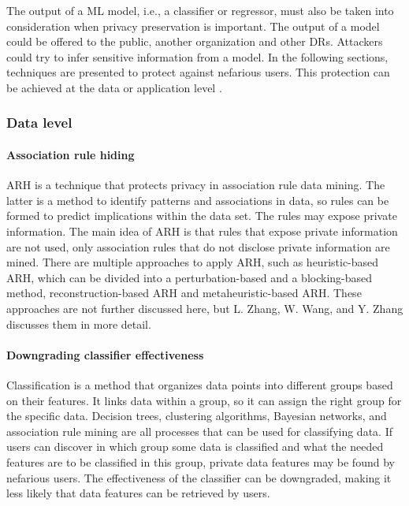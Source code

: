 The output of a \gls{ML} model, i.e., a classifier or regressor, must also be taken into consideration when privacy preservation is important.
The output of a model could be offered to the public, another organization and other \gls{DR}s.
Attackers could try to infer sensitive information from a model.
In the following sections, techniques are presented to protect against nefarious users.
This protection can be achieved at the data or application level \cite{Mendes2017}.

    \subsubsection{Data level}

        \paragraph{Association rule hiding}
        \label{s:AssociationRuleHiding}
        
        \gls{ARH} \cite{Mendes2017, Zhang2019} is a technique that protects privacy in association rule data mining. 
        The latter is a method to identify patterns and associations in data, so rules can be formed to predict implications within the data set. 
        The rules may expose private information.
		  The main idea of \gls{ARH} is that rules that expose private information are not used, only association rules that do not disclose private information are mined.
        There are multiple approaches to apply \gls{ARH}, such as heuristic-based \gls{ARH},
		  which can be divided into a perturbation-based and a blocking-based method, reconstruction-based \gls{ARH} and metaheuristic-based \gls{ARH}. 
        These approaches are not further discussed here, but L. Zhang, W. Wang, and Y. Zhang \cite{Zhang2019} discusses them in more detail.

        \paragraph{Downgrading classifier effectiveness}
        
        Classification \cite{Mendes2017, Skarkala2021} is a method that organizes data points into different groups based on their features.
		  It links data within a group, so it can assign the right group for the specific data.
        Decision trees, clustering algorithms, Bayesian networks, and association rule mining are all processes that can be used for classifying data.
        If users can discover in which group some data is classified and what the needed features are to be classified in this group,
		  private data features may be found by nefarious users. 
        The effectiveness of the classifier can be downgraded, making it less likely that data features can be retrieved by users.

